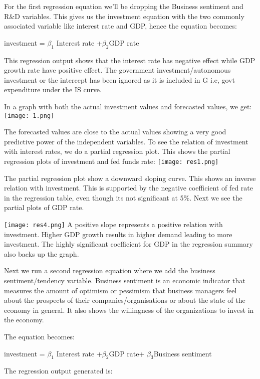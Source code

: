 \documentclass[12pt,a4paper,leqno]{report}
\theoremstyle{definition}
\begin{document}
For the first regression equation we'll be dropping the Business sentiment and R\&D variables. This gives us the investment equation with the two commonly associated variable like interest rate and GDP, hence the equation becomes: 
\begin{center}
	investment = $\beta_{1}$ Interest rate +$\beta_{2}$GDP rate
\end{center}


This regression output shows that the interest rate has negative effect while GDP growth rate have positive effect. The government investment/autonomous investment or the intercept has been ignored as it is included in G i.e, govt expenditure under the IS curve. 

In a graph with both the actual investment values and forecasted values, we get:\newline
\texttt{[image: 1.png]} 

The forecasted values are close to the actual values showing a very good predictive power of the independent variables. To see the relation of investment with interest rates, we do a partial regression plot.
This shows the partial regression plots of investment and fed funds rate:
\texttt{[image: res1.png]}

The partial regression plot show a downward sloping curve. This shows an inverse relation with investment. This is supported by the negative coefficient of fed rate in the regression table, even though its not significant at 5\%. Next we see the partial plots of GDP rate.

\texttt{[image: res4.png]} 
A positive slope represents a positive relation with investment. Higher GDP growth results in higher demand leading to more investment. The highly significant coefficient for GDP in the regression summary also backs up the graph.  

Next we run a second regression equation where we add the business sentiment/tendency variable. Business sentiment  is an economic indicator that measures the amount of optimism or pessimism that business managers feel about the prospects of their companies/organisations or about the state of the economy in general. It also shows the willingness of the organizations to invest in the economy.  

The equation becomes: 
\begin{center}
investment = $\beta_{1}$ Interest rate +$\beta_{2}$GDP rate+ $\beta_{3}$Business sentiment
\end{center}
\newpage
The regression output generated is:

\end{document}
